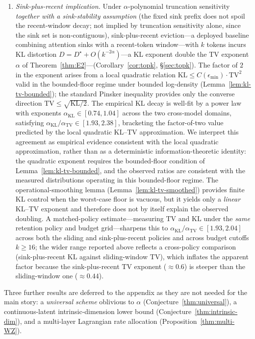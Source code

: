 \documentclass[11pt]{article}
\newcommand{\KLs}{\mathrm{KL}}
\newcommand{\TV}{\mathrm{TV}}
\theoremstyle{plain}
\theoremstyle{definition}
\theoremstyle{remark}
\begin{document}
\begin{enumerate}[label=\textbf{(C\arabic*)},leftmargin=*,itemsep=2pt,topsep=2pt]
\item \emph{Sink-plus-recent implication.} Under
$\alpha$-polynomial truncation sensitivity \emph{together with a
sink-stability assumption} (the fixed sink prefix does not spoil the
recent-window decay; not implied by truncation sensitivity alone,
since the sink set is non-contiguous), sink-plus-recent eviction---a
deployed baseline combining attention sinks with a recent-token
window---with $k$ tokens incurs KL distortion
$D = D^\star + O(k^{-2\alpha})$---a KL exponent double the TV exponent
$\alpha$ of Theorem~\ref{thm:E2}---(Corollary~\ref{cor:topk}, \S\ref{sec:topk}).
The factor of $2$ in the exponent arises from a local quadratic
relation $\KLs \leq C(\epsilon_{\min}) \cdot \TV^2$ valid in the
bounded-floor regime under bounded log-density
(Lemma~\ref{lem:kl-tv-bounded}); the standard Pinsker inequality
provides only the converse direction $\TV \leq \sqrt{\KLs/2}$. The
empirical KL decay is well-fit by a power law with exponents
$\alpha_{\KLs} \in [0.74, 1.04]$ across the two cross-model domains,
satisfying $\alpha_{\KLs}/\alpha_{\TV} \in [1.93, 2.38]$, bracketing
the factor-of-two value predicted by the local quadratic KL--TV
approximation. We interpret this agreement as empirical evidence
consistent with the local quadratic approximation, rather than as a
deterministic information-theoretic identity: the quadratic exponent
requires the bounded-floor condition of
Lemma~\ref{lem:kl-tv-bounded}, and the observed ratios are consistent
with the measured distributions operating in this bounded-floor
regime. The operational-smoothing lemma
(Lemma~\ref{lem:kl-tv-smoothed}) provides finite KL control when the
worst-case floor is vacuous, but it yields only a \emph{linear}
KL--TV exponent and therefore does not by itself explain the observed
doubling. A matched-policy estimate---measuring $\TV$ and $\KLs$
under the \emph{same} retention policy and budget grid---sharpens
this to $\alpha_{\KLs}/\alpha_{\TV} \in [1.93, 2.04]$ across both the
sliding and sink-plus-recent policies and across budget cutoffs
$k \ge 16$; the wider range reported above reflects a cross-policy
comparison (sink-plus-recent $\KLs$ against sliding-window $\TV$),
which inflates the apparent factor because the sink-plus-recent
$\TV$ exponent ($\approx 0.6$) is steeper than the sliding-window
one ($\approx 0.44$).
\end{enumerate}

Three further results are deferred to the appendix as they are not
needed for the main story: a \emph{universal scheme} oblivious to
$\alpha$ (Conjecture~\ref{thm:universal}), a continuous-latent
intrinsic-dimension lower bound (Conjecture~\ref{thm:intrinsic-dim}), and
a multi-layer Lagrangian rate allocation
(Proposition~\ref{thm:multi-WZ}).
\end{document}
